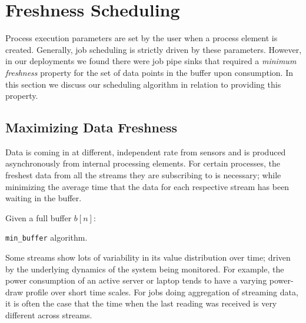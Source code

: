 \section{Freshness Scheduling}
Process execution parameters are set by the user when a process element is created.  Generally, job scheduling is strictly driven
by these parameters.  However, in our deployments we found there were job pipe sinks that required a \emph{minimum freshness}
property for the set of data points in the buffer upon consumption.  In this section we discuss our scheduling algorithm in
relation to providing this property.%


\subsection{Maximizing Data Freshness}
\label{sec:freshness}

Data is coming in at different, independent rate from sensors and is produced asynchronously from internal processing elements.
For certain processes, the freshest
data from all the streams they are subscribing to is necessary; while minimizing the average time that the data for each respective 
stream has 
been waiting in the buffer.


\begin{algorithm}[h!]
 \SetAlgoLined
 Given a full buffer $b[n]$:\\
 \caption{\texttt{min\_buffer} algorithm.}
 \label{alg:min_buffer}
\end{algorithm}


Some streams show lots of variability in its value distribution over time; driven by the underlying dynamics of the system being 
monitored.  For example, the power
consumption of an active server or laptop tends to have a varying power-draw profile over short time scales.  
For jobs doing aggregation of 
streaming data, it is often the case that the time when the last reading was received is very different across streams.  

